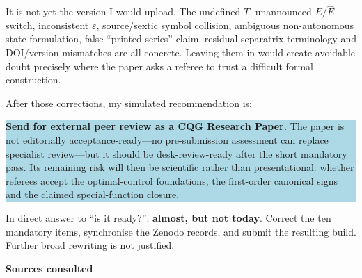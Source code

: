 \documentclass[11pt,a4paper]{article}
\newcommand{\Ehat}{\hat E}
\begin{document}
It is not yet the version I would upload. The undefined $T$, unannounced $E/\Ehat$ switch,
inconsistent $\varepsilon$, source/sextic symbol collision, ambiguous non-autonomous state
formulation, false ``printed series'' claim, residual separatrix terminology and DOI/version
mismatches are all concrete. Leaving them in would create avoidable doubt precisely where the
paper asks a referee to trust a difficult formal construction.

After those corrections, my simulated recommendation is:

\begin{center}
\colorbox{LightBlue}{\parbox{0.90\textwidth}{
\textbf{Send for external peer review as a CQG Research Paper.}
The paper is not editorially acceptance-ready---no pre-submission assessment can replace
specialist review---but it should be desk-review-ready after the short mandatory pass. Its
remaining risk will then be scientific rather than presentational: whether referees accept the
optimal-control foundations, the first-order canonical signs and the claimed special-function
closure.
}}
\end{center}

In direct answer to ``is it ready?'': \textbf{almost, but not today}. Correct the ten mandatory
items, synchronise the Zenodo records, and submit the resulting build. Further broad rewriting is
not justified.

\vspace{0.45em}
{\large\bfseries Sources consulted\par}
\end{document}
